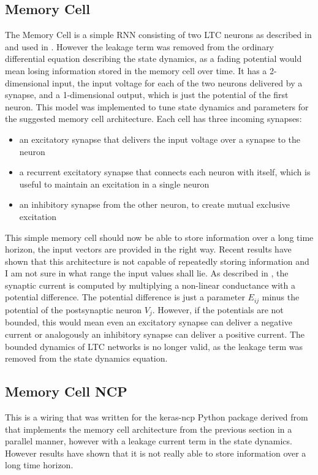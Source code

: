 \documentclass[draft,final]{vutinfth} %
\begin{document}
\subsection{Memory Cell} \label{Memory Cell}
The Memory Cell is a simple RNN consisting of two LTC neurons as described in \cite{LTCNetworks} and used in \cite{NCP}.
However the leakage term was removed from the ordinary differential equation describing the state dynamics, as a fading potential would mean losing information stored in the memory cell over time.
It has a 2-dimensional input, the input voltage for each of the two neurons delivered by a synapse, and a 1-dimensional output, which is just the potential of the first neuron.
This model was implemented to tune state dynamics and parameters for the suggested memory cell architecture.
Each cell has three incoming synapses:
\begin{itemize}
    \item{}
    an excitatory synapse that delivers the input voltage over a synapse to the neuron
    \item{}
    a recurrent excitatory synapse that connects each neuron with itself, which is useful to maintain an excitation in a single neuron
    \item{}
    an inhibitory synapse from the other neuron, to create mutual exclusive excitation 
\end{itemize}
This simple memory cell should now be able to store information over a long time horizon, the input vectors are provided in the right way.
Recent results have shown that this architecture is not capable of repeatedly storing information and I am not sure in what range the input values shall lie. 
As described in \cite{LTCNetworks}, the synaptic current is computed by multiplying a non-linear conductance with a potential difference.
The potential difference is just a parameter $E_{ij}$ minus the potential of the postsynaptic neuron $V_j$. 
However, if the potentials are not bounded, this would mean even an excitatory synapse can deliver a negative current or analogously an inhibitory synapse can deliver a positive current.
The bounded dynamics of LTC networks is no longer valid, as the leakage term was removed from the state dynamics equation.
\subsection{Memory Cell NCP} \label{Memory Cell NCP}
This is a wiring that was written for the keras-ncp Python package derived from \cite{NCP} that implements the memory cell architecture from the previous section in a parallel manner, however with a leakage current term in the state dynamics. 
However results have shown that it is not really able to store information over a long time horizon.
\end{document}
